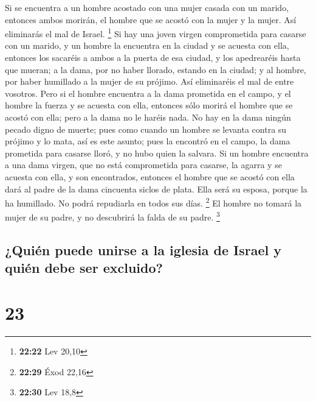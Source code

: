  Si se encuentra a un hombre acostado con una mujer
casada con un marido, entonces ambos morirán, el hombre que se acostó
con la mujer y la mujer. Así eliminarás el mal de Israel. \footnote{\textbf{22:22}
  Lev 20,10}  Si hay una joven virgen comprometida para
casarse con un marido, y un hombre la encuentra en la ciudad y se
acuesta con ella,  entonces los sacaréis a ambos a la
puerta de esa ciudad, y los apedrearéis hasta que mueran; a la dama, por
no haber llorado, estando en la ciudad; y al hombre, por haber humillado
a la mujer de su prójimo. Así eliminaréis el mal de entre vosotros.
 Pero si el hombre encuentra a la dama prometida en el
campo, y el hombre la fuerza y se acuesta con ella, entonces sólo morirá
el hombre que se acostó con ella;  pero a la dama no le
haréis nada. No hay en la dama ningún pecado digno de muerte; pues como
cuando un hombre se levanta contra su prójimo y lo mata, así es este
asunto;  pues la encontró en el campo, la dama prometida
para casarse lloró, y no hubo quien la salvara.  Si un
hombre encuentra a una dama virgen, que no está comprometida para
casarse, la agarra y se acuesta con ella, y son encontrados,
 entonces el hombre que se acostó con ella dará al padre
de la dama cincuenta siclos de plata. Ella será su esposa, porque la ha
humillado. No podrá repudiarla en todos sus días. \footnote{\textbf{22:29}
  Éxod 22,16}  El hombre no tomará la mujer de su padre,
y no descubrirá la falda de su padre. \footnote{\textbf{22:30} Lev 18,8}

\hypertarget{quiuxe9n-puede-unirse-a-la-iglesia-de-israel-y-quiuxe9n-debe-ser-excluido}{%
\subsection{¿Quién puede unirse a la iglesia de Israel y quién debe ser
excluido?}\label{quiuxe9n-puede-unirse-a-la-iglesia-de-israel-y-quiuxe9n-debe-ser-excluido}}

\hypertarget{section-22}{%
\section{23}\label{section-22}}

